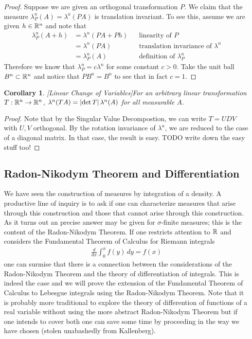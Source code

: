\documentclass{amsart}
\newtheorem{cor}[thm]{Corollary}
\theoremstyle{remark}
\theoremstyle{definition}
\begin{document}
\begin{proof}Suppose we are given an orthogonal transformation $P$.
  We claim that the measure $\lambda^n_P(A) = \lambda^a(P A)$ is
  translation invariant.   To see this, assume we are given $h \in
  \mathbb{R}^n$ and note that 
\begin{align*}
\lambda^n_P(A + h) &= \lambda^n(P A + Ph)  & &\text{linearity of $P$} \\
&= \lambda^n(PA) & &\text{translation invariance of $\lambda^n$} \\
&= \lambda^n_P(A) & &\text{definition of $\lambda^n_P$}
\end{align*}
Therefore we know that $\lambda^n_P = c \lambda^n$ for some constant
$c>0$.  Take the unit ball $B^n \subset \mathbb{R}^n$ and notice that $P
B^n = B^n$ to see that in fact $c = 1$.
\end{proof}
\begin{cor}\label{LesbegueLinearChangeOfVariables}[Linear Change of Variables]For an arbitrary linear transformation $T : \mathbb{R}^n \to
  \mathbb{R}^n$, $\lambda^n(T A) = \left \vert \det{T} \right \vert \lambda^n(A)$ for all
  measurable $A$.
\end{cor}
\begin{proof}Note that by the Singular Value Decompostion, we can
  write $T = U D V$ with $U,V$ orthogonal.  By the rotation invariance
  of $\lambda^n$, we are reduced to the case of a diagonal matrix.  In
  that case, the result is easy.
TODO write down the easy stuff too!
\end{proof}
\subsection{Radon-Nikodym Theorem and Differentiation}
We have seen the construction of measures by integration of a
density.  A productive line of inquiry is to ask if one can
characterize measures that arise through this construction and those
that cannot arise through this construction.  As it
turns out an precise answer may be given for $\sigma$-finite measures;
this is the content of the Radon-Nikodym Theorem.  If one restricts
attention to $\mathbb{R}$ and considers the Fundamental Theorem of
Calculus for Riemann integrals
\begin{align*}
\frac{d}{dx} \int_0^x f(y) \, dy = f(x)
\end{align*}
one can surmise that there is a connection between the considerations
of the Radon-Nikodym Theorem and the theory of differentiation of
integrals.  This is indeed the case and we will prove the extension of
the Fundamental Theorem of Calculus to Lebesgue integrals using the
Radon-Nikodym Theorem.  Note that it is probably more traditional to
explore the theory of differention of functions of a real variable
without using the more abstract Radon-Nikodym Theorem but if one
intends to cover both one can save some time by proceeding in the way
we have chosen (stolen unabashedly from Kallenberg).
\end{document}
